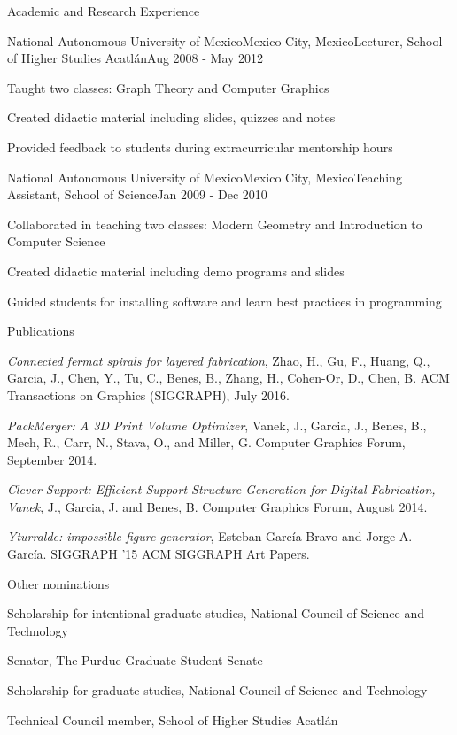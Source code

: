 \documentclass{resume} %
\begin{document}
\begin{rSection}{Academic and Research Experience}
	\begin{rSubsection}{National Autonomous University of Mexico}{Mexico City, Mexico}{Lecturer, School of Higher Studies Acatl\'{a}n}{Aug 2008 - May 2012}
	\item Taught two classes: Graph Theory and Computer Graphics
	\item Created didactic material including slides, quizzes and notes
	\item Provided feedback to students during extracurricular mentorship hours
	\end{rSubsection}
	
	\begin{rSubsection}{National Autonomous University of Mexico}{Mexico City, Mexico}{Teaching Assistant, School of Science}{Jan 2009 - Dec 2010}
	\item Collaborated in teaching two classes: Modern Geometry and Introduction to Computer Science
	\item Created didactic material including demo programs and slides
	\item Guided students for installing software and learn best practices in programming
	\end{rSubsection}

\end{rSection}


\begin{rSection}{Publications} \itemsep -4pt
\item \textit{Connected fermat spirals for layered fabrication}, Zhao, H., Gu, F., Huang, Q., Garcia, J., Chen, Y., Tu, C., Benes, B., Zhang, H., Cohen-Or, D., Chen, B. ACM Transactions on Graphics (SIGGRAPH), July 2016.
\item \textit{PackMerger: A 3D Print Volume Optimizer}, Vanek, J., Garcia, J., Benes, B., Mech, R., Carr, N., Stava, O., and Miller, G. Computer Graphics Forum, September 2014.
\item \textit{Clever Support: Efficient Support Structure Generation for Digital Fabrication, Vanek}, J., Garcia, J. and Benes, B. Computer Graphics Forum, August 2014.
\item \textit{Yturralde: impossible figure generator}, Esteban Garc\'{i}a Bravo and Jorge A. Garc\'{i}a. SIGGRAPH '15 ACM SIGGRAPH Art Papers.
\end{rSection}

\begin{rSection}{Other nominations} \itemsep -8pt
\item Scholarship for intentional graduate studies, National Council of Science and Technology
\item Senator, The Purdue Graduate Student Senate
\item Scholarship for graduate studies, National Council of Science and Technology
\item Technical Council member, School of Higher Studies Acatl\'{a}n
\end{rSection}
\end{document}
